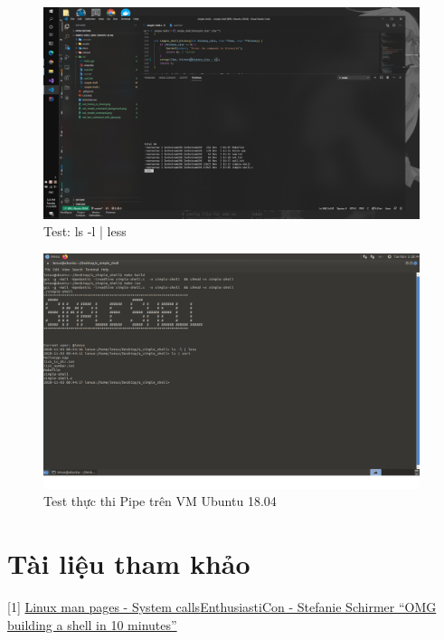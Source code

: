\documentclass{article}
\begin{document}
\begin{figure}[H]
\centering
\includegraphics[width=0.98\textwidth]{wsl_two_command_with_pipe_00.png}
\caption{Test: ls -l | less}
\end{figure}

\begin{figure}[H]
\centering
\includegraphics[width=0.98\textwidth]{virtual_machine_pipe.png}
\caption{Test thực thi Pipe trên VM Ubuntu 18.04}
\end{figure}

\section{Tài liệu tham khảo}
[1] \href{https://linux.die.net/man/2/}{Linux man pages - System calls}\newline
[2] \href{https://www.youtube.com/watch?v=k6TTj4C0LF0}{EnthusiastiCon - Stefanie Schirmer “OMG building a shell in 10 minutes”} \newline
\end{document}
